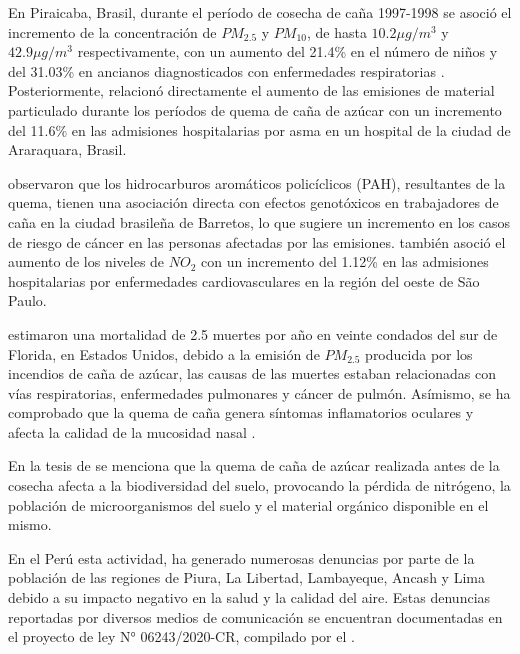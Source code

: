 En Piraicaba, Brasil, durante el período de cosecha de caña 1997-1998 se asoció
el incremento de la concentración de $PM_{2.5}$ y $PM_{10}$, de hasta $10.2 \mu g/m^3$ y $42.9 \mu g/m^3$ respectivamente, con un aumento del 21.4\% en el número de niños y del 31.03\% en ancianos diagnosticados con enfermedades respiratorias \citep{cancado_impact_2006}.
Posteriormente,  \citet{arbex_air_2007} relacionó directamente el aumento de las emisiones de material particulado durante los períodos de quema de caña de azúcar con un incremento del 11.6\% en las admisiones hospitalarias por asma 
en un hospital de la ciudad de Araraquara, Brasil.

\citet{silveira_emissions_2013} observaron que los hidrocarburos aromáticos policíclicos (PAH), resultantes de la quema, tienen una asociación directa con efectos genotóxicos en trabajadores de caña en la ciudad brasileña de Barretos, lo que sugiere un incremento en los casos 
de riesgo de cáncer en las personas afectadas por las emisiones. \citet{pestana_effects_2017} también asoció 
el aumento de los niveles de $NO_{2}$ con un incremento del 1.12\% en las admisiones hospitalarias por enfermedades cardiovasculares en la región del oeste de São Paulo.

\citet{nowell_impacts_2022} estimaron una mortalidad de 2.5 muertes por año en veinte condados del sur de Florida, en Estados Unidos, debido a la emisión de $PM_{2.5}$ producida por los incendios de caña de azúcar, las causas de las muertes estaban 
relacionadas con vías respiratorias, enfermedades pulmonares y cáncer de pulmón. Asímismo, se ha comprobado que la quema de caña genera síntomas inflamatorios oculares 
y afecta la calidad de la mucosidad nasal \citep{matsuda_occupational_2020}. 

En la tesis de \citet[p. 42]{salas_quema_2010} se menciona que la quema de caña de azúcar realizada antes de la cosecha afecta a la biodiversidad del suelo, provocando la pérdida de nitrógeno, la población de microorganismos del suelo y el material orgánico disponible en el mismo.

En el Perú esta actividad, ha generado numerosas denuncias por parte de la población de las regiones de  Piura, La Libertad, Lambayeque, Ancash y
Lima debido a su impacto negativo en la salud y la calidad del aire. Estas denuncias reportadas por diversos medios de comunicación se encuentran documentadas en el proyecto de ley N° 06243/2020-CR, compilado por el \citet[pp. 12-25]{congreso_de_la_republica_ley_2020}. 

